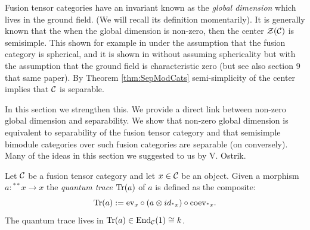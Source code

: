 \documentclass{amsart}
\begin{document}
Fusion tensor categories have an invariant known as the \emph{global dimension} which lives in the ground field. (We will recall its definition momentarily). It is generally known that the when the global dimension is non-zero, then the center $\mathcal Z(\mathcal C)$ is semisimple. This shown for example in \cite[Prop. 3.10]{MR1966525} under the assumption that the fusion category is spherical, and it is shown in \cite[Thm. 2.15]{MR2183279} without assuming sphericality but with the assumption that the ground field is characteristic zero (but see also section 9 that same paper). 
By Theorem \ref{thm:SepModCats} semi-simplicity of the center implies that $\mathcal C$ is separable. 

In this section we strengthen this. We provide a direct link between non-zero global dimension and separability. We show that non-zero global dimension is equivalent to separability of the fusion tensor category and that  semisimple bimodule categories over such fusion categories are separable (on conversely). Many of the ideas in this section we suggested to us by V. Ostrik. 

Let $\mathcal C$ be a fusion tensor category and let $x \in \mathcal C$ be an object. Given a morphism $a: {}^{**}x \to x$ the {\em quantum trace} $\mathrm{Tr}(a)$ of $a$ is defined as the composite: %
\begin{equation*}
	\mathrm{Tr}(a) := \mathrm{ev}_x \circ (a \otimes id_{{}^*x}) \circ \mathrm{coev}_{{}^*x}.
\end{equation*}
The quantum trace lives in $\mathrm{Tr}(a) \in \operatorname{End}_\mathcal C(1) \cong k$. 
\end{document}
